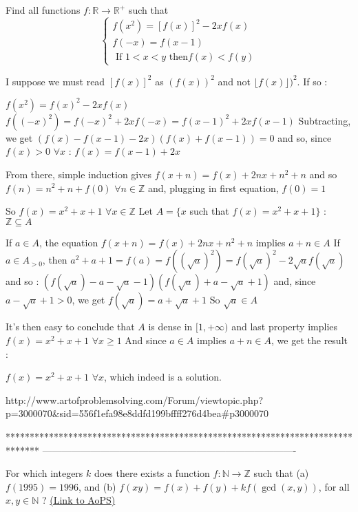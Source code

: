 \begin{solution}
	\begin{tcolorbox}Find all functions $f:\mathbb{R} \to \mathbb{R^+}$ such that \[\begin{cases} f(x^2)=[f(x)]^2-2xf(x) \\ f(-x) = f(x-1) \\ \text{ If } 1<x<y \text{ then} f(x)<f(y) \end{cases}\]\end{tcolorbox}
I suppose we must read $[f(x)]^2$ as $(f(x))^2$ and not $\lfloor f(x)\rfloor)^2$. If so :

$f(x^2)=f(x)^2-2xf(x)$
$f((-x)^2)=f(-x)^2+2xf(-x)=f(x-1)^2+2xf(x-1)$
Subtracting, we get $(f(x)-f(x-1)-2x)(f(x)+f(x-1))=0$ and so, since $f(x)>0$ $\forall x$ : $f(x)=f(x-1)+2x$

From there, simple induction gives $f(x+n)=f(x)+2nx+n^2+n$ and so $f(n)=n^2+n+f(0)$ $\forall n\in\mathbb Z$ and, plugging in first equation, $f(0)=1$

So $f(x)=x^2+x+1$ $\forall x\in\mathbb Z$
Let $A=\{x$ such that $f(x)=x^2+x+1\}$ : $\mathbb Z\subseteq A$

If $a\in A$, the equation $f(x+n)=f(x)+2nx+n^2+n$ implies $a+n\in A$
If $a\in A_{>0}$, then $a^2+a+1=f(a)=f((\sqrt a)^2)=f(\sqrt a)^2-2\sqrt af(\sqrt a)$ and so :
$(f(\sqrt a)-a-\sqrt a-1)(f(\sqrt a)+a-\sqrt a+1)$ and, since $a-\sqrt a+1>0$, we get $f(\sqrt a)=a+\sqrt a+1$
So $\sqrt a\in A$

It's then easy to conclude that $A$ is dense in $[1,+\infty)$ and last property implies $f(x)=x^2+x+1$ $\forall x\ge 1$
And since $a\in A$ implies $a+n\in A$, we get the result :

$\boxed{f(x)=x^2+x+1}$ $\forall x$, which indeed is a solution.
\end{solution}



\begin{solution}
	http://www.artofproblemsolving.com/Forum/viewtopic.php?p=3000070&sid=556f1efa98e8ddfd199bffff276d4bea#p3000070
\end{solution}
*******************************************************************************
-------------------------------------------------------------------------------

\begin{problem}
	For which integers $k$ does  there exists a function $f:\mathbb N \to \mathbb Z$ such that
(a) $f(1995)=1996$, and 
(b) $f(xy)=f(x)+f(y)+kf(\gcd(x,y)) $, for all $x,y\in\mathbb N$ ?
	\flushright \href{https://artofproblemsolving.com/community/c6h566049}{(Link to AoPS)}
\end{problem}



